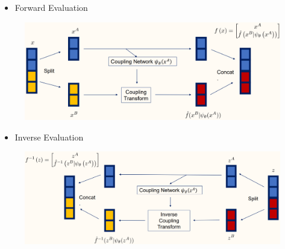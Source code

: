 \documentclass{report}
\begin{document}
\begin{definition}
    \begin{itemize}
        \item Forward Evaluation
    \end{itemize}

    \begin{figure}[H]
        \centering
        \includegraphics[width=1.0\textwidth]{.././assets/10.12.png}
    \end{figure}

    \begin{itemize}
        \item Inverse Evaluation
    \end{itemize}

    \begin{figure}[H]
        \centering
        \includegraphics[width=1.0\textwidth]{.././assets/10.13.png}
    \end{figure}
\end{definition}
\end{document}
